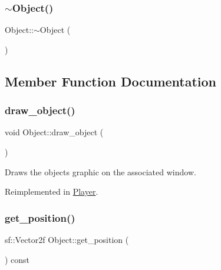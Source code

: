 \mbox{\label{classObject_ae8f5483f459e46687bd01e6f9977afd3}} 
\subsubsection{\texorpdfstring{$\sim$\+Object()}{~Object()}}
{\footnotesize\ttfamily Object\+::$\sim$\+Object (\begin{DoxyParamCaption}{ }\end{DoxyParamCaption})\hspace{0.3cm}{\ttfamily [virtual]}}



\subsection{Member Function Documentation}
\mbox{\label{classObject_a87b1a93e287279985c45941c3e78fed4}} 
\subsubsection{\texorpdfstring{draw\+\_\+object()}{draw\_object()}}
{\footnotesize\ttfamily void Object\+::draw\+\_\+object (\begin{DoxyParamCaption}{ }\end{DoxyParamCaption})\hspace{0.3cm}{\ttfamily [virtual]}}

Draws the objects graphic on the associated window. 

Reimplemented in \hyperlink{classPlayer_a18996f72627e846529e741e4f8efb3dd}{Player}.

\mbox{\label{classObject_a7572a917cf526e55be00ebb51633f9d6}} 
\subsubsection{\texorpdfstring{get\+\_\+position()}{get\_position()}}
{\footnotesize\ttfamily sf\+::\+Vector2f Object\+::get\+\_\+position (\begin{DoxyParamCaption}{ }\end{DoxyParamCaption}) const}

